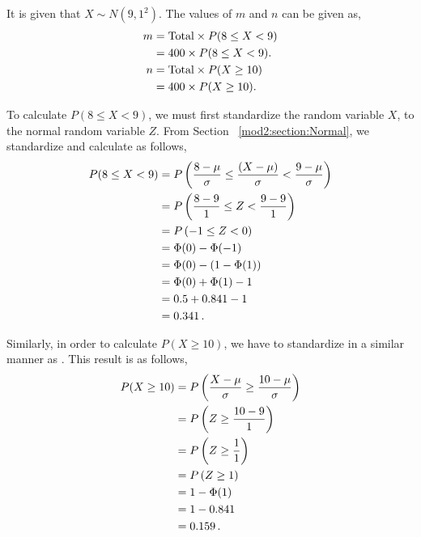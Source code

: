 \begin{subquestions}
\subquestion

\begin{subsubquestions}
	
\subsubquestion

It is given that $X \sim N(9,1^2)$. The values of $m$ and $n$ can be given as,
\begin{align}
	m & = \text{Total} \times P(8 \leq X < 9) \nonumber \\
	  & = 400 \times P(8 \leq X < 9). \nonumber \\
    n & = \text{Total} \times P(X \geq 10) \nonumber \\
      & = 400 \times P(X \geq 10). \label{2015:q4:MNeqn}
\end{align}
	
To calculate $P(8 \leq X < 9)$, we must first standardize the random variable $X$, to the normal random variable $Z$. From Section ~\ref{mod2:section:Normal}, we standardize and calculate as follows,
\begin{align}
	P(8 \leq X < 9) & = P\left(\frac{8- \mu}{\sigma} \leq \frac{(X-\mu)}{\sigma} < \frac{9-\mu}{\sigma} \right) \nonumber \\
	                & = P\left(\frac{8- 9}{1} \leq Z < \frac{9-9}{1} \right) \nonumber \\
	                & = P\left(-1 \leq Z < 0 \right) \nonumber \\
	                & = \Phi(0) - \Phi(-1) \nonumber \\
	                & = \Phi(0) - (1 - \Phi(1)) \nonumber \\
	                & = \Phi(0) + \Phi(1) - 1 \nonumber \\
	                & = 0.5 + 0.841 - 1 \nonumber \\
	                & = 0.341 \,. \label{2015:q4:Normal1}
\end{align}

Similarly, in order to calculate $P(X \geq 10)$, we have to standardize in a similar manner as . This result is as follows,
\begin{align}
	P(X \geq 10) & = P\left(\frac{X-\mu}{\sigma} \geq \frac{10 - \mu}{\sigma} \right) \nonumber \\
	             & = P\left(Z \geq \frac{10-9}{1}\right) \nonumber \\
	             & = P\left(Z \geq \frac{1}{1}\right) \nonumber \\
	             & = P\left(Z \geq 1\right) \nonumber \\
	             & = 1 - \Phi(1) \nonumber \\
	             & = 1 - 0.841 \nonumber \\
	             & = 0.159 \,. \label{2015:q4:Normal2}
\end{align}


\end{subsubquestions}
\end{subquestions}
